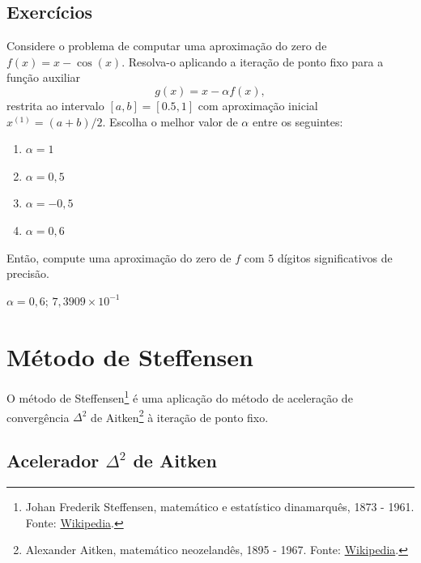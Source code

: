 \subsection*{Exercícios}

\begin{exer}\label{exer:pfixo_1}
  Considere o problema de computar uma aproximação do zero de $f(x)=x-\cos(x)$. Resolva-o aplicando a iteração de ponto fixo para a função auxiliar
  \begin{equation}
    g(x) = x - \alpha f(x),
  \end{equation}
restrita ao intervalo $[a, b] = [0.5, 1]$ com aproximação inicial $x^{(1)}=(a+b)/2$. Escolha o melhor valor de $\alpha$ entre os seguintes:
\begin{enumerate}
\item $\alpha = 1$
\item $\alpha = 0,5$
\item $\alpha = -0,5$
\item $\alpha = 0,6$
\end{enumerate}
Então, compute uma aproximação do zero de $f$ com $5$ dígitos significativos de precisão.
\end{exer}
\begin{resp}
  $\alpha=0,6$; $7,3909\times 10^{-1}$
\end{resp}

\section{Método de Steffensen}\label{cap_eq1d_sec_Steffensen}

O método de Steffensen\footnote{Johan Frederik Steffensen, matemático e estatístico dinamarquês, 1873 - 1961. Fonte: \href{https://en.wikipedia.org/wiki/Johan_Frederik_Steffensen}{Wikipedia}.} é uma aplicação do método de aceleração de convergência $\Delta^2$ de Aitken\footnote{Alexander Aitken, matemático neozelandês, 1895 - 1967. Fonte: \href{https://en.wikipedia.org/wiki/Alexander_Aitken}{Wikipedia}.} à iteração de ponto fixo.

\subsection{Acelerador $\Delta^2$ de Aitken}

